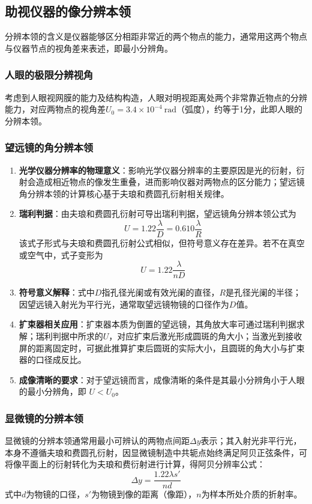 \documentclass{article}
\begin{document}
	\subsection{助视仪器的像分辨本领}
	分辨本领的含义是仪器能够区分相距非常近的两个物点的能力，通常用这两个物点与仪器节点的视角差来表述，即最小分辨角。
	
	\subsubsection{人眼的极限分辨视角}
	考虑到人眼视网膜的能力及结构构造，人眼对明视距离处两个非常靠近物点的分辨能力，对应两物点的视角差$U_0=3.4\times10^{-4}\ \mathrm{rad}$（弧度），约等于1分，此即人眼的分辨本领。
	
	\subsubsection{望远镜的角分辨本领}
	\begin{enumerate}[label=\arabic*., leftmargin=2em, itemsep=0.5em]
		\item \textbf{光学仪器分辨率的物理意义}：影响光学仪器分辨率的主要原因是光的衍射，衍射会造成相近物点的像发生重叠，进而影响仪器对两物点的区分能力；望远镜角分辨本领的计算核心基于夫琅和费圆孔衍射相关规律。
		
		\item \textbf{瑞利判据}：由夫琅和费圆孔衍射可导出瑞利判据，望远镜角分辨本领公式为
		\[
		U=1.22\frac{\lambda}{D}=0.610\frac{\lambda}{R}
		\]
		该式子形式与夫琅和费圆孔衍射公式相似，但符号意义存在差异。若不在真空或空气中，式子变形为
		\[
		U=1.22\frac{\lambda}{nD}
		\]
		
		\item \textbf{符号意义解释}：式中$D$指孔径光阑或有效光阑的直径，$R$是孔径光阑的半径；因望远镜入射光为平行光，通常取望远镜物镜的口径作为$D$值。
		
		\item \textbf{扩束器相关应用}：扩束器本质为倒置的望远镜，其角放大率可通过瑞利判据求解；瑞利判据中所求的$U$，对应扩束后激光形成圆斑的角大小；当激光到接收屏的距离固定时，可据此推算扩束后圆斑的实际大小，且圆斑的角大小与扩束器的口径成反比。
		
		\item \textbf{成像清晰的要求}：对于望远镜而言，成像清晰的条件是其最小分辨角小于人眼的最小分辨角，即 $U<U_0$。
	\end{enumerate}
	
	\subsubsection{显微镜的分辨本领}
	显微镜的分辨本领通常用最小可辨认的两物点间距$\Delta y$表示；其入射光非平行光，本身不遵循夫琅和费圆孔衍射，因显微镜制造中共轭点始终满足阿贝正弦条件，可将像平面上的衍射转化为夫琅和费衍射进行计算，得阿贝分辨率公式：
	\[
	\Delta y=\frac{1.22\lambda s'}{nd}
	\]
	式中$d$为物镜的口径，$s'$为物镜到像的距离（像距），$n$为样本所处介质的折射率。

	
	
	
	
	
	
		
	
\end{document}
